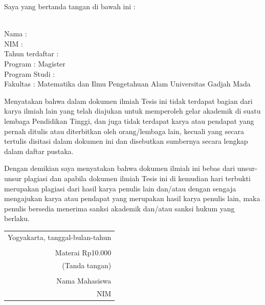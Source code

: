 \noindent Saya yang bertanda tangan di bawah ini :

\vspace{-1em}

\begin{tabbing}
\hspace{40mm} \= \\ %
\noindent Nama \> : \\[\parskip]
\noindent NIM \> :  \\[\parskip]
\noindent Tahun terdaftar \> :  \\[\parskip]
\noindent Program \> : Magister \\[\parskip]
\noindent Program Studi \> :  \\[\parskip]
\noindent Fakultas \> : Matematika dan Ilmu Pengetahuan Alam Universitas Gadjah Mada
\end{tabbing}

\noindent Menyatakan bahwa dalam dokumen ilmiah Tesis ini tidak terdapat bagian dari karya ilmiah lain yang telah diajukan untuk memperoleh gelar akademik di suatu lembaga Pendidikan Tinggi, dan juga tidak terdapat karya atau pendapat yang pernah ditulis atau diterbitkan oleh orang/lembaga lain, kecuali yang secara tertulis disitasi dalam dokumen ini dan disebutkan sumbernya secara lengkap dalam daftar pustaka.

\noindent Dengan demikian saya menyatakan bahwa dokumen ilmiah ini bebas dari unsur-unsur plagiasi dan apabila dokumen ilmiah Tesis ini di kemudian hari terbukti merupakan plagiasi dari hasil karya penulis lain dan/atau dengan sengaja mengajukan karya atau pendapat yang merupakan hasil karya penulis lain, maka penulis bersedia menerima sanksi akademik dan/atau sanksi hukum yang berlaku.


\begin{flushright}
	\begin{tabular}{r}
		Yogyakarta, tanggal-bulan-tahun \\
		\vspace{0.1cm} \\
		\tiny{Materai Rp10.000} \\
		\tiny{(Tanda tangan)} \\	
		\vspace{0.1cm} \\
		Nama Mahasiswa \\ NIM
	\end{tabular}
\end{flushright}